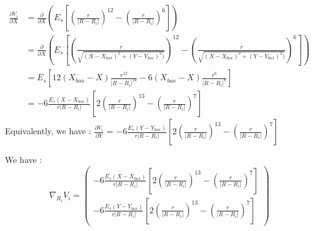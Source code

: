 \documentclass{article}
\begin{document}
\begin{align*}
    \frac{\partial V_i}{\partial X} &= \frac{\partial}{\partial X} \left( E_s \left[ \left( \frac{r}{\lvert R - R_i \rvert} \right)^{12} - \left( \frac{r}{\lvert R - R_i \rvert} \right) ^6 \right] \right) \\
    &= \frac{\partial}{\partial X} \left( E_s \left[ \left( \frac{r}{\sqrt{( X-X_{box})^2 + (Y-Y_{box})^2)}} \right)^{12} - \left( \frac{r}{\sqrt{( X-X_{box})^2 + (Y-Y_{box})^2)}} \right) ^6 \right] \right) \\
    &= E_s\left[ 12(X_{box}-X)\frac{r^{12}}{\lvert R - R_i\rvert^{14}} - 6(X_{box}-X)\frac{r^6}{\lvert R-R_i\rvert^8} \right] \\
    &= -6 \frac{E_s (X-X_{box})}{r \lvert R - R_i \rvert } \left[ 2 \left( \frac{r}{\lvert R-R_i\rvert} \right)^{13} - \left( \frac{r}{\lvert R-R_i\rvert}\right)^7 \right] 
\end{align*}
Equivalently, we have : $\frac{\partial V_i}{\partial Y}$ = $ -6 \frac{E_s (Y-Y_{box})}{r \lvert R - R_i \rvert } \left[ 2 \left( \frac{r}{\lvert R-R_i\rvert} \right)^{13} - \left( \frac{r}{\lvert R-R_i\rvert}\right)^7 \right]$

We have : 
\begin{equation*}
    \boxed{\nabla_{R_i} V_i = \begin{pmatrix}
        -6 \frac{E_s (X-X_{box})}{r \lvert R - R_i \rvert } \left[ 2 \left( \frac{r}{\lvert R-R_i\rvert} \right)^{13} - \left( \frac{r}{\lvert R-R_i\rvert}\right)^7 \right] \\
        -6 \frac{E_s (Y-Y_{box})}{r \lvert R - R_i \rvert } \left[ 2 \left( \frac{r}{\lvert R-R_i\rvert} \right)^{13} - \left( \frac{r}{\lvert R-R_i\rvert}\right)^7 \right]
    \end{pmatrix}}
\end{equation*}
\end{document}
